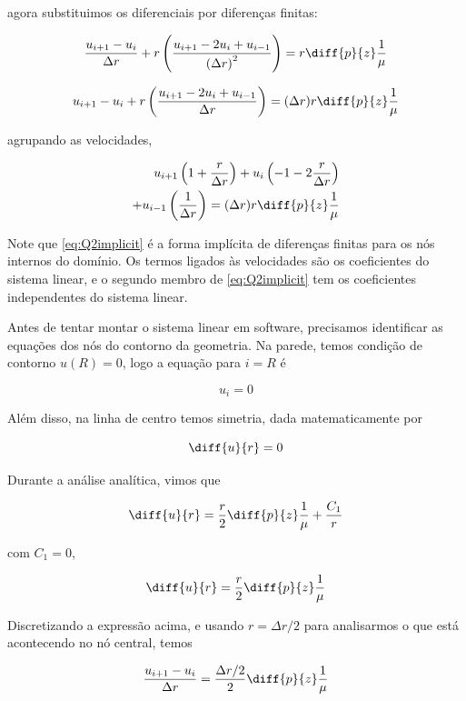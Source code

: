 \noindent agora substituimos os diferenciais por diferenças finitas:

\[ \frac{u_{i+1} - u_i}{\Delta r} + r \left(\frac{u_{i+1} - 2u_i + u_{i-1}}{\left(\Delta r\right)^2}\right) = r \diff{p}{z} \frac{1}{\mu} \]

\[ u_{i+1} - u_i + r \left(\frac{u_{i+1} - 2u_i + u_{i-1}}{\Delta r}\right) = (\Delta r) r \diff{p}{z} \frac{1}{\mu} \]

\noindent agrupando as velocidades,

\begin{equation}\label{eq:Q2implicit}
    \begin{split}
        u_{i+1} \left(1 + \frac{r}{\Delta r}\right) + u_i \left(-1 - 2\frac{r}{\Delta r}\right) \\ + u_{i-1} \left(\frac{1}{\Delta r}\right) = (\Delta r) r \diff{p}{z} \frac{1}{\mu}
    \end{split}
\end{equation}

Note que \eqref{eq:Q2implicit} é a forma implícita de diferenças finitas para os nós
internos do domínio. Os termos ligados às velocidades são os coeficientes do sistema linear,
e o segundo membro de \eqref{eq:Q2implicit} tem os coeficientes independentes do sistema linear.

Antes de tentar montar o sistema linear em software, precisamos identificar as equações dos nós do
contorno da geometria. Na parede, temos condição de contorno $u(R) = 0$, logo a equação para $i = R$ é

\begin{equation}\label{eq:Q2implicitBoundary}
    u_i = 0
\end{equation}

Além disso, na linha de centro temos simetria, dada matematicamente por

\[ \diff{u}{r} = 0 \]

Durante a análise analítica, vimos que

\[ \diff{u}{r} = \frac{r}{2} \diff{p}{z} \frac{1}{\mu} + \frac{C_1}{r} \]

\noindent com $C_1 = 0$,

\[ \diff{u}{r} = \frac{r}{2} \diff{p}{z} \frac{1}{\mu} \]

Discretizando a expressão acima, e usando $r = \Delta r / 2$ para analisarmos
o que está acontecendo no nó central, temos

\[ \frac{u_{i+1} - u_i}{\Delta r} = \frac{\Delta r / 2}{2} \diff{p}{z} \frac{1}{\mu} \]

